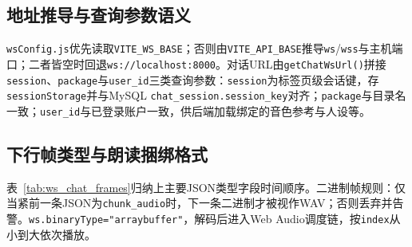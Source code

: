 \documentclass{base}
\begin{document}
\subsection{地址推导与查询参数语义}

\begin{sloppypar}
    \texttt{wsConfig.js}优先读取\texttt{VITE\_WS\_BASE}；否则由\texttt{VITE\_API\_BASE}推导\texttt{ws}/\texttt{wss}与主机端口；二者皆空时回退\texttt{ws://localhost:8000}。对话URL由\texttt{getChatWsUrl()}拼接\texttt{session}、\texttt{package}与\texttt{user\_id}三类查询参数：\texttt{session}为标签页级会话键，存\texttt{sessionStorage}并与MySQL \texttt{chat\_session.session\_key}对齐；\texttt{package}与目录名一致；\texttt{user\_id}与已登录账户一致，供后端加载绑定的音色参考与人设等。
\end{sloppypar}

\subsection{下行帧类型与朗读捆绑格式}

\begin{sloppypar}
    表~\ref{tab:ws_chat_frames}归纳上主要JSON类型字段时间顺序。二进制帧规则：仅当紧前一条JSON为\texttt{chunk\_audio}时，下一条二进制才被视作WAV；否则丢弃并告警。\texttt{ws.binaryType="arraybuffer"}，解码后进入Web Audio调度链，按\texttt{index}从小到大依次播放。
\end{sloppypar}
\end{document}
